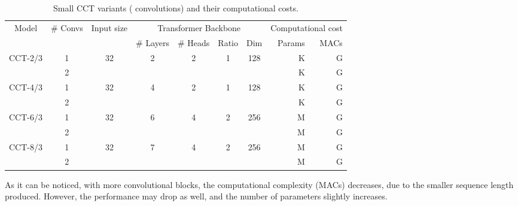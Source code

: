 \documentclass[10pt,twocolumn,letterpaper]{article}
\begin{document}
\begin{table*}[t]
    \centering
    \begin{tabular}{c|c|c|cccc|rr}
        \toprule
        \multicolumn{1}{c|}{\multirow{2}{*}{Model}} &
        \multicolumn{1}{c|}{\multirow{2}{*}{\# Convs}} &
        \multicolumn{1}{c|}{\multirow{2}{*}{Input size}} & \multicolumn{4}{c}{Transformer Backbone} & \multicolumn{2}{c}{Computational cost} \\
        &&& \# Layers & \# Heads & Ratio & Dim & Params & MACs \\
        \midrule
        \multirow{2}{*}{CCT-2/3} & 1 & \multirow{2}{*}{32} & \multirow{2}{*}{2} & \multirow{2}{*}{2} & \multirow{2}{*}{1} & \multirow{2}{*}{128} &  K &  G \\
        & 2 &&&&&&  K &  G \\
        \midrule
        \multirow{2}{*}{CCT-4/3} & 1 & \multirow{2}{*}{32} & \multirow{2}{*}{4} & \multirow{2}{*}{2} & \multirow{2}{*}{1} & \multirow{2}{*}{128} &  K &  G \\
        & 2 &&&&&&  K &  G \\
        \midrule
        \multirow{2}{*}{CCT-6/3} & 1 & \multirow{2}{*}{32} & \multirow{2}{*}{6} & \multirow{2}{*}{4} & \multirow{2}{*}{2} & \multirow{2}{*}{256} &  M &  G \\
        & 2 &&&&&&  M &  G \\
        \midrule
        \multirow{2}{*}{CCT-8/3} & 1 & \multirow{2}{*}{32} & \multirow{2}{*}{7} & \multirow{2}{*}{4} & \multirow{2}{*}{2} & \multirow{2}{*}{256} &  M &  G \\
        & 2 &&&&&&  M &  G \\
        \bottomrule
    \end{tabular}
    \caption{Small CCT variants ( convolutions) and their computational costs.}
    \label{tab:small_model_sizes}
\end{table*}
 
As it can be noticed, with more convolutional blocks, the computational complexity (MACs) decreases, due to the smaller sequence length produced. However, the performance may drop as well, and the number of parameters slightly increases.
\end{document}
